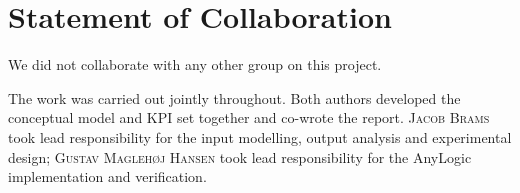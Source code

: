\section{Statement of Collaboration}
\label{sec:collab}

We did not collaborate with any other group on this project.

The work was carried out jointly throughout. Both authors developed the
conceptual model and KPI set together and co-wrote the report.
\textsc{Jacob Brams} took lead responsibility for the input modelling, output
analysis and experimental design; \textsc{Gustav Maglehøj Hansen} took lead
responsibility for the AnyLogic implementation and verification.
